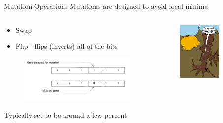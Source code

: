\documentclass[compress]{beamer}
\begin{document}
\begin{frame}{Mutation Operations}
Mutations are designed to avoid local minima
\begin{columns}
\begin{column}{0.45\textwidth}
  \begin{itemize}
    \item Swap
    \item Flip - flips (inverts) all of the bits
  \end{itemize}
    \begin{figure}
      \centering
      \includegraphics[width=0.4\textheight]{mutation_example.png}
    \end{figure}
	Typically set to be around a few percent
\end{column}
\begin{column}{0.45\textwidth}
\begin{figure}
	\centering
	\includegraphics[width=0.75\textwidth]{AllTheBestWork.png}
\end{figure}
\end{column}
\end{columns}
\end{frame}
\end{document}
